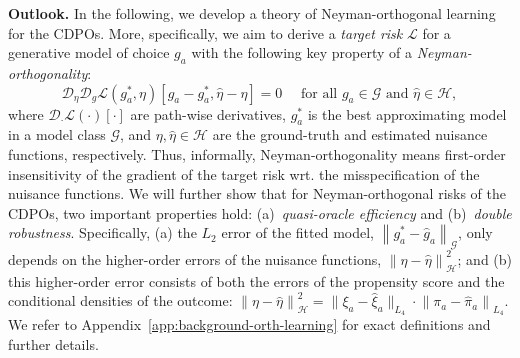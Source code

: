 \documentclass[dvipsnames]{article} %
\newcommand{\norm}[1]{\left\lVert#1\right\rVert}
\newcommand{\CDPOs}{CDPOs\xspace}
\begin{document}
{\textbf{Outlook.} In the following, we develop a theory of Neyman-orthogonal learning for the \CDPOs. More, specifically, we aim to derive a \emph{target risk} $\mathcal{L}$ for a generative model of choice $g_a$ with the following key property of a \emph{Neyman-orthogonality}:  
\begin{equation}
    \mathcal{D}_\eta \mathcal{D}_g\mathcal{L}(g_a^*, \eta)[g_a - g_a^*, \hat{\eta} - \eta] = 0 \quad \text{ for all $g_a \in \mathcal{G}$ and $\hat{\eta} \in \mathcal{H}$},
\end{equation}
where $\mathcal{D}_{\cdot} \mathcal{L}(\cdot)[\cdot]$ are path-wise derivatives, $g_a^*$ is the best approximating model in a model class $\mathcal{G}$, and $\eta, \hat{\eta} \in \mathcal{H}$ are the ground-truth and estimated nuisance functions, respectively. Thus, informally, Neyman-orthogonality means first-order insensitivity of the gradient of the target risk wrt. the misspecification of the nuisance functions. We will further show that for Neyman-orthogonal risks of the \CDPOs, two important properties hold: (a)~\emph{quasi-oracle efficiency} and (b)~\emph{double robustness}. Specifically, (a) the $L_2$ error of the fitted model, $\norm{g_a^* - \hat{g}_a}_{\mathcal{G}}$, only depends on the higher-order errors of the nuisance functions, $\norm{\eta - \hat{\eta}}_{\mathcal{H}}^2$; and (b) this higher-order error consists of both the errors of the propensity score and the conditional densities of the outcome: $\norm{\eta - \hat{\eta}}_{\mathcal{H}}^2 = \lVert\xi_a - \hat{\xi}_a \rVert_{L_4} \cdot \norm{\pi_a - \hat{\pi}_a}_{L_4}$.
We refer to Appendix~\ref{app:background-orth-learning} for exact definitions and further details.
}


\end{document}
